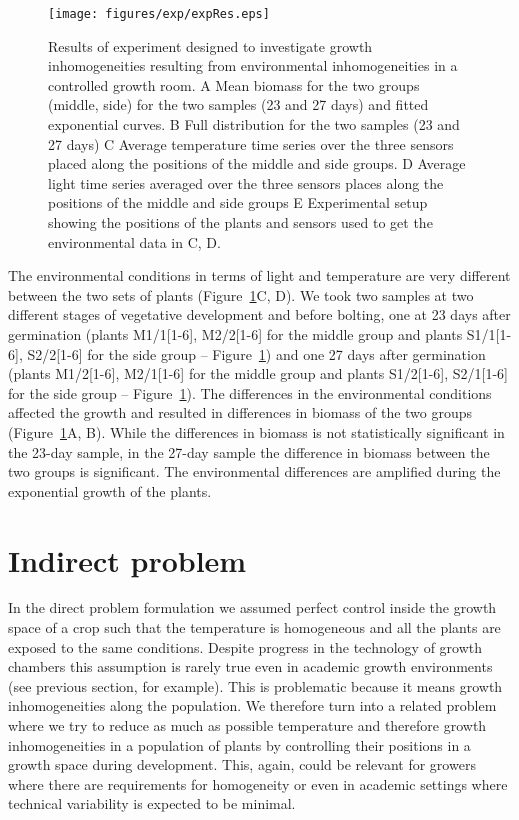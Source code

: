 \begin{figure}
\centering
\texttt{[image: figures/exp/expRes.eps]}
\caption{
  Results of experiment designed to investigate growth inhomogeneities resulting
  from environmental inhomogeneities in a controlled growth room. A Mean biomass
  for the two groups (middle, side) for the two samples (23 and 27 days) and
  fitted exponential curves. B Full distribution for the two samples (23 and 27
  days) C Average temperature time series over the three sensors placed along
  the positions of the middle and side groups. D Average light time series
  averaged over the three sensors places along the positions of the middle and
  side groups E Experimental setup showing the positions of the plants and
  sensors used to get the environmental data in C, D.
}
\label{fig:expRes}
\end{figure}

The environmental conditions in terms of light and temperature are very
different between the two sets of plants (Figure~\ref{fig:expRes}C, D). We took
two samples at two different stages of vegetative development and before
bolting, one at 23 days after germination (plants M1/1[1-6], M2/2[1-6] for the
middle group and plants S1/1[1-6], S2/2[1-6] for the side group --
Figure~\ref{fig:expRes}) and one 27 days after germination (plants M1/2[1-6],
M2/1[1-6] for the middle group and plants S1/2[1-6], S2/1[1-6] for the side
group -- Figure~\ref{fig:expRes}). The differences in the environmental
conditions affected the growth and resulted in differences in biomass of the two
groups (Figure~\ref{fig:expRes}A, B). While the differences in biomass is not
statistically significant in the 23-day sample, in the 27-day sample the
difference in biomass between the two groups is significant. The environmental
differences are amplified during the exponential growth of the plants.


\section{Indirect problem}
In the direct problem formulation we assumed perfect control inside the growth
space of a crop such that the temperature is homogeneous and all the plants are
exposed to the same conditions. Despite progress in the technology of growth
chambers this assumption is rarely true even in academic growth environments
(see previous section, for example). This is problematic because it means growth
inhomogeneities along the population. We therefore turn into a related problem
where we try to reduce as much as possible temperature and therefore growth
inhomogeneities in a population of plants by controlling their positions in a
growth space during development. This, again, could be relevant for growers
where there are requirements for homogeneity or even in academic settings where
technical variability is expected to be minimal.


